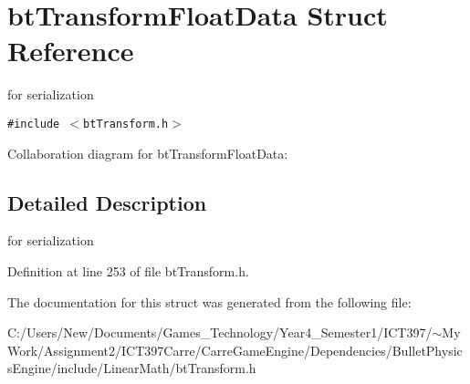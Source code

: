 \hypertarget{structbt_transform_float_data}{
\section{btTransformFloatData Struct Reference}
\label{structbt_transform_float_data}
}
for serialization  


{\tt \#include $<$btTransform.h$>$}

Collaboration diagram for btTransformFloatData:

\subsection{Detailed Description}
for serialization 

Definition at line 253 of file btTransform.h.

The documentation for this struct was generated from the following file:\begin{CompactItemize}
\item 
C:/Users/New/Documents/Games\_\-Technology/Year4\_\-Semester1/ICT397/$\sim$My Work/Assignment2/ICT397Carre/CarreGameEngine/Dependencies/BulletPhysicsEngine/include/LinearMath/btTransform.h\end{CompactItemize}
